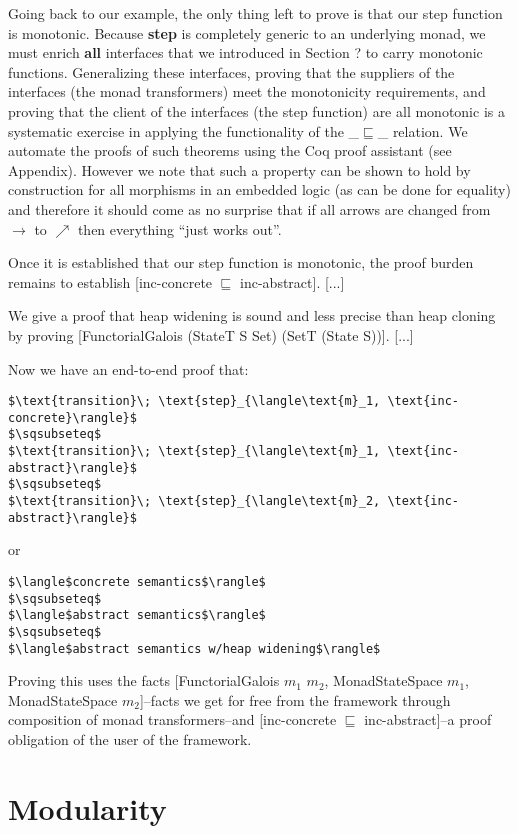 \documentclass{article}
\begin{document}
Going back to our example, the only thing left to prove is that our step
function is monotonic.
%
Because \textbf{step} is completely generic to an underlying monad, we must
enrich \textbf{all} interfaces that we introduced in Section ? to carry
monotonic functions.
%
Generalizing these interfaces, proving that the suppliers of the interfaces
(the monad transformers) meet the monotonicity requirements, and proving that
the client of the interfaces (the step function) are all monotonic is a
systematic exercise in applying the functionality of the \_$\sqsubseteq$\_
relation.
%
We automate the proofs of such theorems using the Coq proof assistant (see
Appendix).
%
However we note that such a property can be shown to hold by construction for
all morphisms in an embedded logic (as can be done for equality) and therefore
it should come as no surprise that if all arrows are changed from $\to$ to
$\nearrow$ then everything ``just works out''.

Once it is established that our step function is monotonic, the proof burden
remains to establish [inc-concrete $\sqsubseteq$ inc-abstract]. [...]

We give a proof that heap widening is sound and less precise than heap cloning
by proving [FunctorialGalois (StateT S Set) (SetT (State S))]. [...]

Now we have an end-to-end proof that:
\begin{lstlisting}[mathescape]
$\text{transition}\; \text{step}_{\langle\text{m}_1, \text{inc-concrete}\rangle}$
$\sqsubseteq$
$\text{transition}\; \text{step}_{\langle\text{m}_1, \text{inc-abstract}\rangle}$
$\sqsubseteq$
$\text{transition}\; \text{step}_{\langle\text{m}_2, \text{inc-abstract}\rangle}$
\end{lstlisting}
or
\begin{lstlisting}[mathescape]
$\langle$concrete semantics$\rangle$
$\sqsubseteq$
$\langle$abstract semantics$\rangle$
$\sqsubseteq$
$\langle$abstract semantics w/heap widening$\rangle$
\end{lstlisting}
%
Proving this uses the facts [FunctorialGalois $m_1$ $m_2$, MonadStateSpace
$m_1$, MonadStateSpace $m_2$]--facts we get for free from the framework through
composition of monad transformers--and [inc-concrete $\sqsubseteq$
inc-abstract]--a proof obligation of the user of the framework.


\section{Modularity}
\label{section:modularity}
\end{document}
